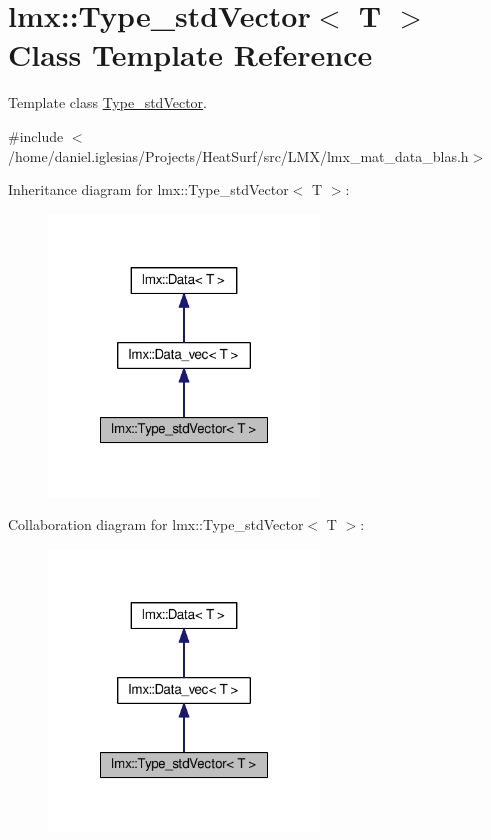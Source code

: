 \hypertarget{classlmx_1_1Type__stdVector}{\section{lmx\-:\-:Type\-\_\-std\-Vector$<$ T $>$ Class Template Reference}
\label{classlmx_1_1Type__stdVector}
}


Template class \hyperlink{classlmx_1_1Type__stdVector}{Type\-\_\-std\-Vector}.  




{\ttfamily \#include $<$/home/daniel.\-iglesias/\-Projects/\-Heat\-Surf/src/\-L\-M\-X/lmx\-\_\-mat\-\_\-data\-\_\-blas.\-h$>$}



Inheritance diagram for lmx\-:\-:Type\-\_\-std\-Vector$<$ T $>$\-:
\nopagebreak
\begin{figure}[H]
\begin{center}
\leavevmode
\includegraphics[width=204pt]{classlmx_1_1Type__stdVector__inherit__graph}
\end{center}
\end{figure}


Collaboration diagram for lmx\-:\-:Type\-\_\-std\-Vector$<$ T $>$\-:
\nopagebreak
\begin{figure}[H]
\begin{center}
\leavevmode
\includegraphics[width=204pt]{classlmx_1_1Type__stdVector__coll__graph}
\end{center}
\end{figure}
